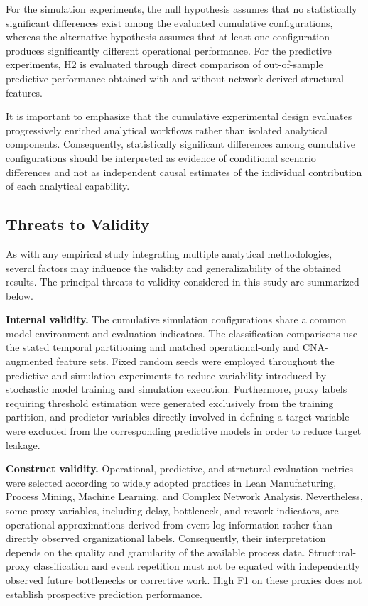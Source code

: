 \documentclass[pdflatex,iicol,Numbered,sn-basic]{sn-jnl}
\begin{document}
For the simulation experiments, the null hypothesis assumes that no statistically significant differences exist among the evaluated cumulative configurations, whereas the alternative hypothesis assumes that at least one configuration produces significantly different operational performance. For the predictive experiments, H2 is evaluated through direct comparison of out-of-sample predictive performance obtained with and without network-derived structural features.

It is important to emphasize that the cumulative experimental design evaluates progressively enriched analytical workflows rather than isolated analytical components. Consequently, statistically significant differences among cumulative configurations should be interpreted as evidence of conditional scenario differences and not as independent causal estimates of the individual contribution of each analytical capability.


\subsection{Threats to Validity}
\label{subsec:threats_to_validity}

As with any empirical study integrating multiple analytical methodologies, several factors may influence the validity and generalizability of the obtained results. The principal threats to validity considered in this study are summarized below.

\textbf{Internal validity.}
The cumulative simulation configurations share a common model environment and evaluation indicators. The classification comparisons use the stated temporal partitioning and matched operational-only and CNA-augmented feature sets. Fixed random seeds were employed throughout the predictive and simulation experiments to reduce variability introduced by stochastic model training and simulation execution. Furthermore, proxy labels requiring threshold estimation were generated exclusively from the training partition, and predictor variables directly involved in defining a target variable were excluded from the corresponding predictive models in order to reduce target leakage.

\textbf{Construct validity.}
Operational, predictive, and structural evaluation metrics were selected according to widely adopted practices in Lean Manufacturing, Process Mining, Machine Learning, and Complex Network Analysis. Nevertheless, some proxy variables, including delay, bottleneck, and rework indicators, are operational approximations derived from event-log information rather than directly observed organizational labels. Consequently, their interpretation depends on the quality and granularity of the available process data. Structural-proxy classification and event repetition must not be equated with independently observed future bottlenecks or corrective work. High F1 on these proxies does not establish prospective prediction performance.
\end{document}
